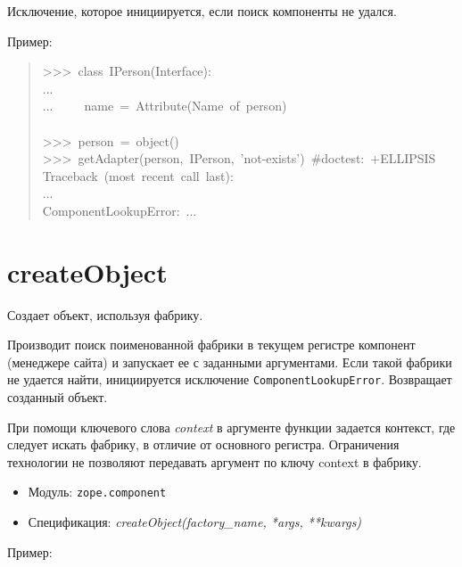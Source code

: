 \documentclass[a4paper,openany,twoside,final]{book}
\providecommand*{\DUroletitlereference}[1]{\textsl{#1}}
\begin{document}
Исключение, которое инициируется, если поиск компоненты не удался.

Пример:

\begin{quote}{\ttfamily \raggedright \noindent
>{}>{}>~class~IPerson(Interface):\\
...\\
...~~~~~name~=~Attribute(\textquotedbl{}Name~of~person\textquotedbl{})\\
~\\
>{}>{}>~person~=~object()\\
>{}>{}>~getAdapter(person,~IPerson,~'not-exists')~\#doctest:~+ELLIPSIS\\
Traceback~(most~recent~call~last):\\
...\\
ComponentLookupError:~...
}
\end{quote}


\section*{createObject%
  \label{createobject}%
}

Создает объект, используя фабрику.

Производит поиск поименованной фабрики в текущем регистре
компонент (менеджере сайта) и запускает ее с заданными аргументами.
Если такой фабрики не удается найти, инициируется исключение
\texttt{ComponentLookupError}.  Возвращает созданный объект.

При помощи ключевого слова \DUroletitlereference{context} в аргументе функции задается
контекст, где следует искать фабрику, в отличие от основного регистра.
Ограничения технологии не позволяют передавать аргумент по ключу
\textquotedbl{}context\textquotedbl{} в фабрику.

\begin{itemize}

\item Модуль: \texttt{zope.component}

\item Спецификация: \DUroletitlereference{createObject(factory\_name, *args, **kwargs)}

\end{itemize}

Пример:
\end{document}
